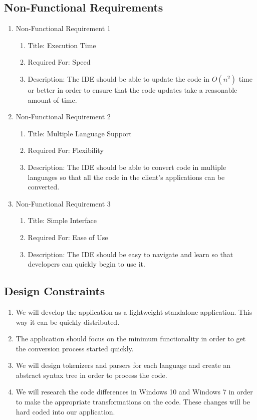 \documentclass[12pt]{article}
\begin{document}
\subsection{Non-Functional Requirements}

\begin{enumerate}
    \item Non-Functional Requirement 1
    \begin{enumerate}
        \item Title: Execution Time
        \item Required For: Speed
        \item Description: The IDE should be able to update the code in \(O(n^2)\) time or better in order to ensure that the code updates
        take a reasonable amount of time.
    \end{enumerate}
    \item Non-Functional Requirement 2
    \begin{enumerate}
        \item Title: Multiple Language Support
        \item Required For: Flexibility
        \item Description: The IDE should be able to convert code in multiple languages so that all the code in the client's applications
        can be converted.
    \end{enumerate}
    \item Non-Functional Requirement 3
    \begin{enumerate}
        \item Title: Simple Interface
        \item Required For: Ease of Use
        \item Description: The IDE should be easy to navigate and learn so that developers can quickly begin to use it.
    \end{enumerate}
\end{enumerate}

\subsection{Design Constraints}

\begin{enumerate}
    \item We will develop the application as a lightweight standalone application. This way it can be quickly distributed.
    \item The application should focus on the minimum functionality in order to get the conversion process started quickly.
    \item We will design tokenizers and parsers for each language and create an abstract syntax tree in order to process the code.
    \item We will research the code differences in Windows 10 and Windows 7 in order to make the appropriate transformations on the code.
    These changes will be hard coded into our application.
\end{enumerate}
\end{document}
